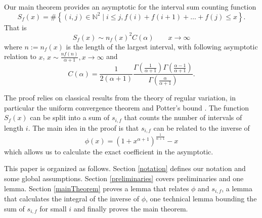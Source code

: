 \documentclass[10pt]{article}
\theoremstyle{plain}
\theoremstyle{definition}
\begin{document}
	Our main theorem provides an asymptotic for the interval sum counting function
	\begin{equation}
		S_f(x)=\#\left\{(i, j)\in\mathbb{N}^2\mid i\le j, f(i)+f(i+1)+\dots+f(j)\le x\right\}.
	\end{equation}
	That is
	\begin{equation}
		S_f(x)\sim n_f(x)^2C(\alpha) \qquad x\to\infty
	\end{equation}
	where $n:=n_f(x)$ is the length of the largest interval, with following asymptotic relation to $x$, $x\sim \frac{nf(n)}{\alpha+1}, x\to\infty$ and 
	\begin{equation}
		C(\alpha)=\frac{1}{2(\alpha+1)}
		\frac{\Gamma(\frac{1}{\alpha+1})\Gamma(\frac{\alpha-1}{\alpha+1})}{\Gamma(\frac{\alpha}{\alpha+1})}.
	\end{equation} 
	
	The proof relies on classical results from the theory of regular variation, in particular the uniform convergence theorem and Potter's bound \cite{bingham1987regular}. The function $S_f(x)$ can be split into a sum of $s_{i, f}$ that counts the number of intervals of length $i$. The main idea in the proof is that $s_{i, f}$ can be related to the inverse of 
	\begin{equation}
		\phi(x)=(1+x^{\alpha+1})^{\frac{1}{\alpha+1}}-x
	\end{equation} 
	which allows us to calculate the exact coefficient in the asymptotic.
	
	This paper is organized as follows. Section \ref{notation} defines our notation and some global assumptions. Section \ref{preliminaries} covers preliminaries and one lemma. Section \ref{mainTheorem} proves a lemma that relates $\phi$ and $s_{i, f}$, a lemma that calculates the integral of the inverse of $\phi$, one technical lemma bounding the sum of $s_{i, f}$ for small $i$ and finally proves the main theorem.
	
	
	
	
	
	
	
	
	
	
	
	
	
\end{document}
